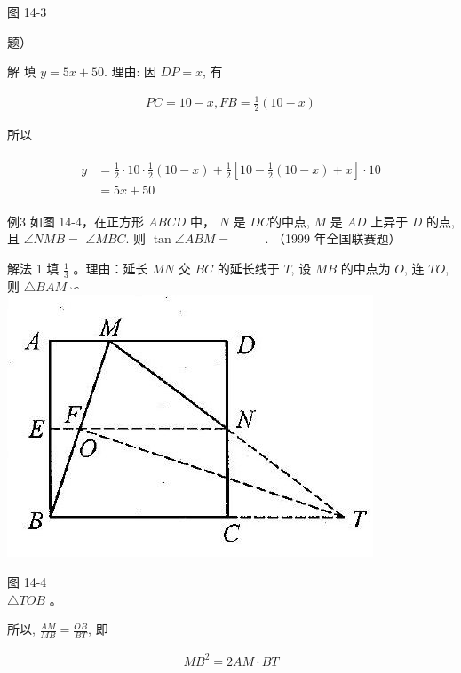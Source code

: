 \documentclass[10pt]{article}
\begin{document}
图 14-3

题）

解 填 $y=5 x+50$. 理由: 因 $D P=x$, 有

\begin{align*}
P C=10-x, F B=\frac{1}{2}(10-x)
\end{align*}

所以

\begin{align*}
\begin{aligned}
y & =\frac{1}{2} \cdot 10 \cdot \frac{1}{2}(10-x)+\frac{1}{2}\left[10-\frac{1}{2}(10-x)+x\right] \cdot 10 \\
& =5 x+50
\end{aligned}
\end{align*}

例3 如图 14-4，在正方形 $A B C D$ 中， $N$ 是 $D C$的中点, $M$ 是 $A D$ 上异于 $D$ 的点, 且 $\angle N M B=$ $\angle M B C$. 则 $\tan \angle A B M=$ $\qquad$ . （1999 年全国联赛题）

解法 1 填 $\frac{1}{3}$ 。理由：延长 $M N$ 交 $B C$ 的延长线于 $T$, 设 $M B$ 的中点为 $O$, 连 $T O$, 则 $\triangle B A M \backsim$\\
\includegraphics[max width=\textwidth, center]{2024_10_30_2c8f45efd4a519b08e1ag-128}

图 14-4\\
$\triangle T O B$ 。

所以, $\frac{A M}{M B}=\frac{O B}{B T}$, 即

\begin{align*}
M B^{2}=2 A M \cdot B T \tag{1}
\end{align*}
\end{document}

